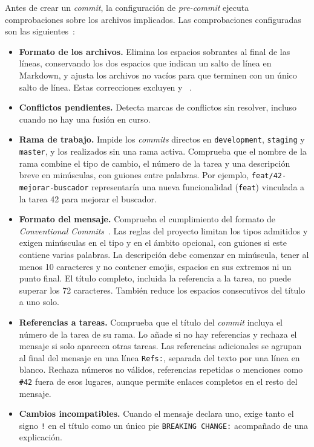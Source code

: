 Antes de crear un \textit{commit}, la configuración de \textit{pre-commit}
ejecuta comprobaciones sobre los archivos implicados. Las comprobaciones configuradas  son las siguientes~\cite{precommit_documentacion}:

\begin{itemize}
    \item \textbf{Formato de los archivos.} Elimina los espacios sobrantes al
    final de las líneas, conservando los dos espacios que indican un salto
    de línea en Markdown, y
    ajusta los archivos no vacíos para que terminen con un único salto de
    línea. Estas correcciones excluyen  y
    ~\cite{precommit_hooks}.

    \item \textbf{Conflictos pendientes.} Detecta marcas de conflictos sin
    resolver, incluso cuando no hay una fusión en curso.

    \item \textbf{Rama de trabajo.} Impide los \textit{commits} directos en
    \texttt{development}, \texttt{staging} y \texttt{master}, y los realizados
    sin una rama activa. Comprueba que el nombre de la rama combine el tipo
    de cambio, el número de la tarea y una descripción breve en minúsculas,
    con guiones entre palabras. Por ejemplo,
    \texttt{feat/42-mejorar-buscador} representaría una nueva funcionalidad
    (\texttt{feat}) vinculada a la tarea 42 para mejorar el buscador.

    \item \textbf{Formato del mensaje.} Comprueba el cumplimiento del formato de
    \textit{Conventional Commits}~\cite{conventional_commits}.
    Las reglas del proyecto limitan los tipos admitidos y exigen minúsculas
    en el tipo y en el ámbito opcional, con guiones si este contiene varias palabras.
    La descripción debe comenzar en minúscula, tener al menos 10 caracteres
    y no contener emojis, espacios en sus extremos ni un punto final. El
    título completo, incluida la referencia a la tarea, no puede superar
    los 72 caracteres. También reduce los espacios consecutivos del título
    a uno solo.

    \item \textbf{Referencias a tareas.} Comprueba que el título del
    \textit{commit} incluya el número de la tarea de su rama. Lo añade si no
    hay referencias y rechaza el mensaje si solo aparecen otras tareas.
    Las referencias adicionales se agrupan al final del mensaje en una línea
    \texttt{Refs:}, separada del texto por una línea en blanco. Rechaza
    números no válidos, referencias repetidas o menciones como
    \texttt{\#42} fuera de esos lugares, aunque permite enlaces completos
    en el resto del mensaje.

    \item \textbf{Cambios incompatibles.} Cuando el mensaje declara uno,
    exige tanto el signo \texttt{!} en el título como un único pie
    \texttt{BREAKING CHANGE:} acompañado de una explicación.
\end{itemize}

